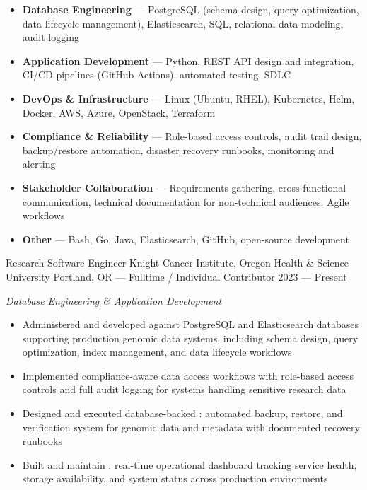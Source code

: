




\begin{itemize}
    \item \textbf{Database Engineering} --- PostgreSQL (schema design, query optimization, data lifecycle management), Elasticsearch, SQL, relational data modeling, audit logging
    \item \textbf{Application Development} --- Python, REST API design and integration, CI/CD pipelines (GitHub Actions), automated testing, SDLC
    \item \textbf{DevOps \& Infrastructure} --- Linux (Ubuntu, RHEL), Kubernetes, Helm, Docker, AWS, Azure, OpenStack, Terraform
    \item \textbf{Compliance \& Reliability} --- Role-based access controls, audit trail design, backup/restore automation, disaster recovery runbooks, monitoring and alerting
    \item \textbf{Stakeholder Collaboration} --- Requirements gathering, cross-functional communication, technical documentation for non-technical audiences, Agile workflows
    \item \textbf{Other} --- Bash, Go, Java, Elasticsearch, GitHub, open-source development
\end{itemize}


\showoff
{Research Software Engineer}
{Knight Cancer Institute, Oregon Health \& Science University}
{Portland, OR --- Fulltime / Individual Contributor}
{2023 --- Present}

\vspace{1em}

\emph{Database Engineering \& Application Development}

\begin{itemize}
    \item Administered and developed against PostgreSQL and Elasticsearch databases supporting production genomic data systems, including schema design, query optimization, index management, and data lifecycle workflows
    \item Implemented compliance-aware data access workflows with role-based access controls and full audit logging for systems handling sensitive research data
    \item Designed and executed database-backed : automated backup, restore, and verification system for genomic data and metadata with documented recovery runbooks
    \item Built and maintain : real-time operational dashboard tracking service health, storage availability, and system status across production environments
\end{itemize}

